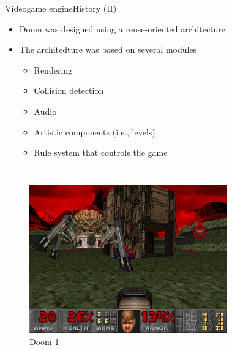 \documentclass[10pt,compress]{beamer} %
\begin{document}
\begin{frame}{Videogame engine}{History (II)}
	\begin{itemize}
	\item Doom was designed using a reuse-oriented architecture
	\item The architedture was based on several modules
		\begin{itemize}
		\item Rendering
		\item Collision detection
		\item Audio
		\item Artistic components (i.e., levels)
		\item Rule system that controls the game
		\end{itemize}
		\end{itemize}
	\vspace{-0.4cm}
    \begin{columns}
   	 	\begin{figure}[t]
		\begin{center}
		    \includegraphics[width=\linewidth]{figs/doom1}\\
			Doom 1
			\bigskip
		\end{center}
   	 	\end{figure}
   	 	\begin{figure}[t]
		\begin{center}

\end{center}
\end{figure}
\end{columns}
\end{frame}
\end{document}
